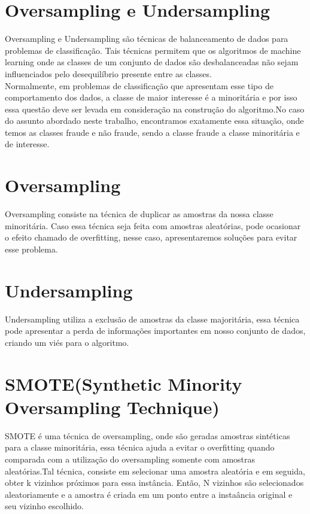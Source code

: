 \documentclass{article}
\begin{document}
\section{Oversampling e Undersampling}

Oversampling e Undersampling são técnicas de balanceamento de dados para problemas de classificação. Tais técnicas permitem que os algoritmos de machine learning onde as classes de um conjunto de dados são desbalanceadas não sejam influenciados pelo desequilíbrio presente entre as classes.
\\
Normalmente, em problemas de classificação que apresentam esse tipo de comportamento dos dados, a classe de maior interesse é a minoritária e por isso essa questão deve ser levada em consideração na construção do algoritmo.No caso do assunto abordado neste trabalho, encontramos exatamente essa situação, onde temos as classes fraude e não fraude, sendo a classe fraude a classe minoritária e de interesse.
\\

\section{Oversampling}
Oversampling consiste na técnica de duplicar as amostras da nossa classe minoritária. Caso essa técnica seja feita com amostras aleatórias, pode ocasionar o efeito chamado de overfitting, nesse caso, apresentaremos soluções para evitar esse problema.
\section{Undersampling}
Undersampling utiliza a exclusão de amostras da classe majoritária, essa técnica pode apresentar a perda de informações importantes em nosso conjunto de dados, criando um viés para o algoritmo.
\\
\section{SMOTE(Synthetic Minority Oversampling Technique)}
SMOTE é uma técnica de oversampling, onde são geradas amostras sintéticas para a classe minoritária, essa técnica ajuda a evitar o overfitting quando comparada com a utilização do oversampling somente com amostras aleatórias.Tal técnica, consiste em selecionar uma amostra aleatória e em seguida, obter k vizinhos próximos para essa instância. Então, N vizinhos são selecionados aleatoriamente e a amostra é criada em um ponto entre a instaância original e seu vizinho escolhido.
\end{document}
